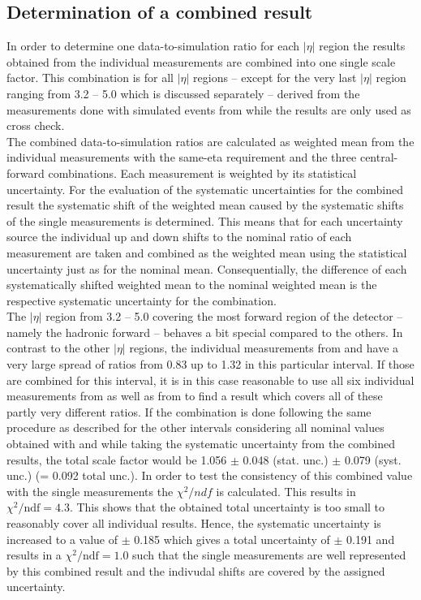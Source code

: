 \subsection{Determination of a combined result}
\label{subsec:jer_combination}
In order to determine one data-to-simulation ratio for each $|\eta|$ region the results obtained from the individual measurements are combined into one single scale factor. This combination is for all $|\eta|$ regions -- except for the very last $|\eta|$ region ranging from 3.2 -- 5.0 which is discussed separately -- derived from the measurements done with simulated events from \pythia while the \herwig results are only used as cross check. \\
The combined data-to-simulation ratios are calculated as weighted mean from the individual measurements with the same-eta requirement and the three central-forward combinations. Each measurement is weighted by its statistical uncertainty. For the evaluation of the systematic uncertainties for the combined result the systematic shift of the weighted mean caused by the systematic shifts of the single measurements is determined. This means that for each uncertainty source the individual up and down shifts to the nominal ratio of each measurement are taken and combined as the weighted mean using the statistical uncertainty just as for the nominal mean. Consequentially, the difference of each systematically shifted weighted mean to the nominal weighted mean is the respective systematic uncertainty for the combination. \\
The $|\eta|$ region from 3.2 -- 5.0 covering the most forward region of the detector -- namely the hadronic forward -- behaves a bit special compared to the others. In contrast to the other $|\eta|$ regions, the individual measurements from \pythia and \herwig have a very large spread of ratios from 0.83 up to 1.32 in this particular interval. If those are combined for this interval, it is in this case reasonable to use all six individual measurements from \pythia as well as from \herwig to find a result which covers all of these partly very different ratios. If the combination is done following the same procedure as described for the other intervals considering all nominal values obtained with \pythia and \herwig while taking the systematic uncertainty from the combined \pythia results, the total scale factor would be 1.056 $\pm$ 0.048 (stat. unc.) $\pm$ 0.079 (syst. unc.) (= 0.092 total unc.). In order to test the consistency of this combined value with the single measurements the $\chi^2/ndf$ is calculated. This results in $\chi^2/\mathrm{ndf} = 4.3$. This shows that the obtained total uncertainty is too small to reasonably cover all individual results. Hence, the systematic uncertainty is increased to a value of $\pm$ 0.185 which gives a total uncertainty of $\pm$ 0.191 and results in a $\chi^2/\mathrm{ndf} = 1.0$ such that the single measurements are well represented by this combined result and the indivudal shifts are covered by the assigned uncertainty.\\
